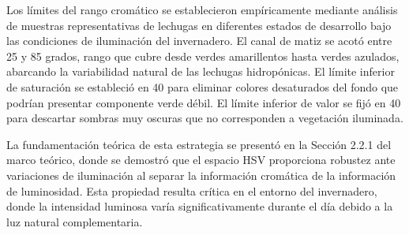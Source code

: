 Los límites del rango cromático se establecieron empíricamente mediante análisis de muestras representativas de lechugas en diferentes estados de desarrollo bajo las condiciones de iluminación del invernadero. El canal de matiz se acotó entre 25 y 85 grados, rango que cubre desde verdes amarillentos hasta verdes azulados, abarcando la variabilidad natural de las lechugas hidropónicas. El límite inferior de saturación se estableció en 40 para eliminar colores desaturados del fondo que podrían presentar componente verde débil. El límite inferior de valor se fijó en 40 para descartar sombras muy oscuras que no corresponden a vegetación iluminada.

La fundamentación teórica de esta estrategia se presentó en la Sección 2.2.1 del marco teórico, donde se demostró que el espacio HSV proporciona robustez ante variaciones de iluminación al separar la información cromática de la información de luminosidad. Esta propiedad resulta crítica en el entorno del invernadero, donde la intensidad luminosa varía significativamente durante el día debido a la luz natural complementaria.

